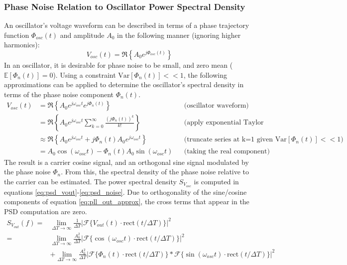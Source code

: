 		\subsubsection{Phase Noise Relation to Oscillator Power Spectral Density}\label{sec:pn_to_psd}
		An oscillator's voltage waveform can be described in terms of a phase trajectory function $\Phi_{osc}(t)$ and amplitude $A_0$ in the following manner (ignoring higher harmonics):
		\begin{equation}\label{eq:osc_wfm}
			V_{osc}(t) = \Re\left\{A_0e^{j\Phi_{osc}(t)}\right\}
		\end{equation}
		 In an oscillator, it is desirable for phase noise to be small, and zero mean ($\mathbb{E}[\Phi_{n}(t)]=0$). Using a constraint $\mathrm{Var}[\Phi_{n}(t)] << 1$, the following approximations can be applied to determine the oscillator's spectral density in terms of the phase noise component $\Phi_n(t)$.
		\begin{align}
			V_{osc}(t) &= \Re\left\{A_0e^{j\omega_{osc}t}e^{j\Phi_{n}(t)}\right\} && \text{(oscillator waveform)} \\
			&= \Re\left\{A_0e^{j\omega_{osc}t}\sum_{k=0}^\infty\frac{(j\Phi_{n}(t))^k}{k!}\right\} && \text{(apply exponential Taylor series)} \\
			&\approx  \Re\left\{A_0e^{j\omega_{osc}t} +j\Phi_{n}(t)A_0e^{j\omega_{osc}t}\right\} && \text{(truncate series at k=1 given $\mathrm{Var}[\Phi_{n}(t)] << 1$)} \\
			&= A_0\cos(\omega_{osc}t) - \Phi_{n}(t)A_0\sin(\omega_{osc}t) &&\text{(taking the real component)}\label{eq:pll_out_approx}
		\end{align}
		The result is a carrier cosine signal, and an orthogonal sine signal modulated by the phase noise $\Phi_{n}$. From this, the spectral density of the phase noise relative to the carrier can be estimated. The power spectral density $S_{V_{osc}}$ is computed in equations \ref{eq:psd_vout}-\ref{eq:psd_noise}. Due to orthogonality of the sine/cosine components of equation \ref{eq:pll_out_approx}, the cross terms that appear in the PSD computation are zero. 
		\begin{align}
			S_{V_{out}}(f) =& \lim_{\Delta T\rightarrow\infty}\frac{1}{\Delta T}|\mathcal{F}\{V_{out}(t)\cdot\mathrm{rect}(t/\Delta T)\}|^2 \label{eq:psd_vout}\\
			=&\lim_{\Delta T\rightarrow\infty}\frac{A_0^2}{\Delta T}|\mathcal{F}\{\cos(\omega_{osc}t)\cdot\mathrm{rect}(t/\Delta T)\}|^2 \label{eq:psd_carrier}\\ 
			&+ \lim_{\Delta T\rightarrow\infty}\frac{A_0^2}{\Delta T}|\mathcal{F}\{\Phi_{n}(t)\cdot\mathrm{rect}(t/\Delta T)\}*\mathcal{F}\{\sin(\omega_{osc}t)\cdot\mathrm{rect}(t/\Delta T)\}|^2 \label{eq:psd_noise}
		\end{align}
